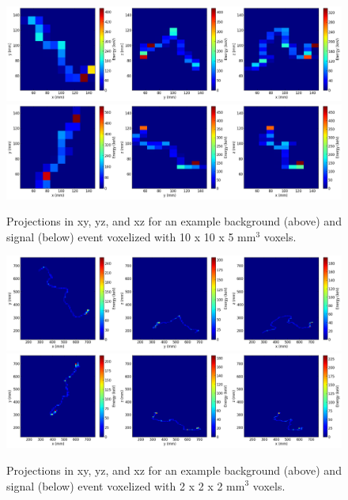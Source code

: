 \documentclass[a4paper,11pt]{article}
\begin{document}
\begin{figure}[!htb]
	\centering
	\includegraphics[scale=0.36]{fig/plt_h2D_vox_dnn3d_NEXT100_Paolina10105_v10x10x5_r200x200x200_2_bg.png}
	\includegraphics[scale=0.36]{fig/plt_h2D_vox_dnn3d_NEXT100_Paolina10105_v10x10x5_r200x200x200_3_si.png}
	\caption{\label{fig.exampleProjs10105}Projections in xy, yz, and xz for an example background (above) and signal (below) event voxelized with 10 x 10 x 5 mm$^3$ voxels.}
\end{figure}

\begin{figure}[!htb]
	\centering
	\includegraphics[scale=0.36]{fig/plt_h2D_vox_dnn3d_NEXT100_Paolina222_v2x2x2_r200x200x200_0_bg.png}
	\includegraphics[scale=0.36]{fig/plt_h2D_vox_dnn3d_NEXT100_Paolina222_v2x2x2_r200x200x200_2_si.png}
	\caption{\label{fig.exampleProjs222}Projections in xy, yz, and xz for an example background (above) and signal (below) event voxelized with 2 x 2 x 2 mm$^3$ voxels.}
\end{figure}
\end{document}
